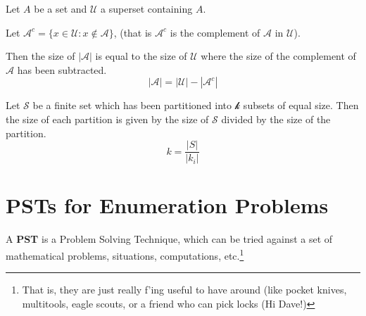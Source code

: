 \documentclass{article}
\begin{document}

\begin{tcolorbox}[title={The Subtraction Principle}, colback={white},colframe={black},colbacktitle={white},coltitle={black},fonttitle=\bfseries,subtitle style={boxrule=0.4pt,colback=white}]

Let $A$ be a set and $\mathcal{U}$ a superset containing $A$. 

Let $\mathcal{A}^{c} = \{ x\in \mathcal{U} : x \not\in \mathcal{A}\}$, (that is $\mathcal{A}^{c}$ is the complement of $\mathcal{A}$ in $\mathcal{U}$). 

Then the size of $|\mathcal{A}|$ is equal to the size of $\mathcal{U}$ where the size of the complement of $\mathcal{A}$ has been subtracted. 
\[|\mathcal{A}| = |\mathcal{U}| - |\mathcal{A}^{c}|\]
\end{tcolorbox}



\begin{tcolorbox}[title={Division Principle}, colback={white},colframe={black},colbacktitle={white},coltitle={black},fonttitle=\bfseries,subtitle style={boxrule=0.4pt,colback=white}]
		
Let $\mathcal{S}$ be a finite set which has been partitioned into $\mathcal{k}$ subsets of equal size. Then the size of each partition is given by the size of $\mathcal{S}$ divided by the size of the partition.  \[k = \frac{|S|}{|k_{i}|}\]
\end{tcolorbox}


\section{PSTs for Enumeration Problems}

A \textbf{PST} is a Problem Solving Technique, which can be tried against a set of mathematical problems, situations, computations, etc.\footnote{That is, they are just really f'ing useful to have around (like pocket knives, multitools, eagle scouts, or a friend who can pick locks (Hi Dave!)}
\medskip
\end{document}
